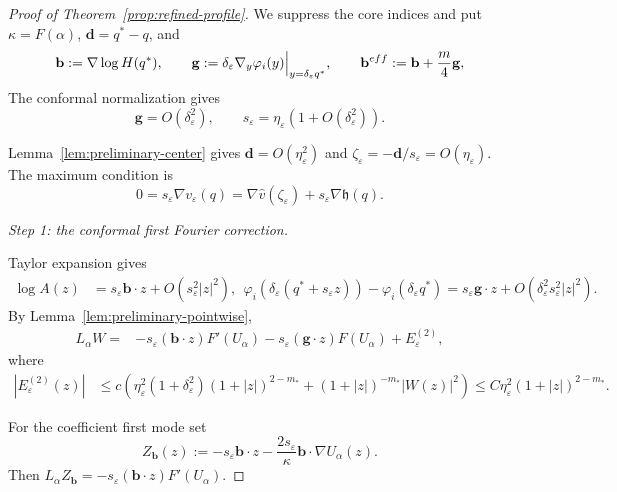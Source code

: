 \documentclass[10pt,a4paper]{amsart}
\numberwithin{equation}{section}
\theoremstyle{definition}
\theoremstyle{remark}
\newcommand{\eps}{\varepsilon}
\newcommand{\etae}{\eta_{\eps}}
\newcommand{\de}{\delta_{\eps}}
\begin{document}
\setcounter{section}{8}
\setcounter{equation}{21}
\setcounter{theorem}{3}
\begin{proof}[Proof of Theorem~\ref{prop:refined-profile}]
We suppress the core indices and put $\kappa=F(\alpha)$,
$\mathbf{d}=q^*-q$, and
{ 
\begin{equation}
  \mathbf{b}:=\nabla\log H(q^*),
  \qquad
  \mathbf{g}:=\de\nabla_y\varphi_i(y)\Big|_{y=\de q^*},
  \qquad
  \mathbf{b}^{\rm eff}:=\mathbf{b}+\frac m4\mathbf{g},
  \label{eq:b-g-effective}
\end{equation}
}
The conformal normalization gives
\begin{equation}
  \mathbf{g}=O(\de^2),
  \qquad
  s_\eps=\etae(1+O(\de^2)).
  \label{eq:s-g-size}
\end{equation}

Lemma~\ref{lem:preliminary-center} gives $\mathbf{d}=O(\etae^2)$ and
$\zeta_\eps=-\mathbf{d}/s_\eps=O(\etae)$. The maximum condition is
\begin{equation}
  0
  =
  s_\eps\nabla v_\eps(q)
  =
  \nabla\widehat v(\zeta_\eps)
  +s_\eps\nabla\mathfrak h(q).
  \label{eq:max-condition-scaled}
\end{equation}

\medskip
\noindent
{ 
\emph{Step 1: the conformal first Fourier correction.}
}

Taylor expansion gives
{ 
\begin{align}
  \log A(z)
  &=
  s_\eps \mathbf{b}\cdot z
  +O(s_\eps^2|z|^2),
  \ \
  \varphi_i(\de(q^*+s_\eps z))
  -\varphi_i(\de q^*)
  =
  s_\eps \mathbf{g}\cdot z
  +O(\de^2s_\eps^2|z|^2).
  \label{eq:conformal-first}
\end{align}
}
By Lemma~\ref{lem:preliminary-pointwise},
{ 
\begin{align}
  L_\alpha W
  ={}&
  -s_\eps(\mathbf{b}\cdot z)F'(U_\alpha)
  -s_\eps(\mathbf{g}\cdot z)F(U_\alpha)
  +E_\eps^{(2)},
  \label{eq:W-first-decomposition}
\end{align}
}
where \begin{equation}
\begin{aligned}
  |E_\eps^{(2)}(z)|
  &\le 
  c\left(\eta_\eps^2(1+\de^2)
  (1+|z|)^{2-m_*}
 +
  (1+|z|)^{-m_*}|W(z)|^2\right)  \le C \eta_\eps^2
  (1+|z|)^{2-m_*}.
  \label{eq:E2-crude}
\end{aligned}\end{equation}

For the coefficient first mode set
\begin{equation}
  Z_{\mathbf{b}}(z)
  :=
  -s_\eps \mathbf{b}\cdot z
  -\frac{2s_\eps}{\kappa}
   \mathbf{b}\cdot\nabla U_\alpha(z).
  \label{eq:explicit-first-mode}
\end{equation}
Then
\(L_\alpha Z_{\mathbf{b}} = -s_\eps(\mathbf{b}\cdot z)F'(U_\alpha).\)


\end{proof}
\end{document}
